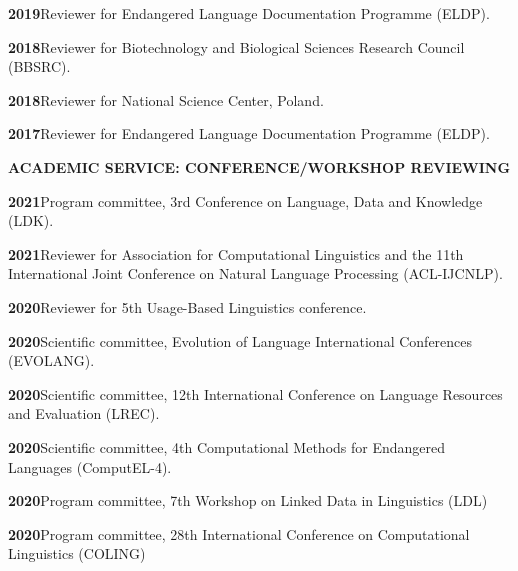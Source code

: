 \documentclass[11pt]{article}
\newcommand{\hangpara}{
 \setlength{\parindent}{0in} %
 \hangindent=0.42in %
}
\begin{document}
\vskip 6pt
\hangpara
{\bf 2019}\hspace{1ex}Reviewer for Endangered Language Documentation Programme (ELDP).

\vskip 6pt
\hangpara
{\bf 2018}\hspace{1ex}Reviewer for Biotechnology and Biological Sciences Research Council (BBSRC).

\vskip 6pt
\hangpara
{\bf 2018}\hspace{1ex}Reviewer for National Science Center, Poland.

\vskip 6pt
\hangpara
{\bf 2017}\hspace{1ex}Reviewer for Endangered Language Documentation Programme (ELDP).


\vskip 20pt
\begin{flushleft}
{\bf ACADEMIC SERVICE: CONFERENCE/WORKSHOP REVIEWING}
\end{flushleft}


\hangpara
{\bf 2021}\hspace{1ex}Program committee, 3rd Conference on Language, Data and Knowledge (LDK).

\hangpara
\vskip 6pt
{\bf 2021}\hspace{1ex}Reviewer for Association for Computational Linguistics and the 11th International Joint Conference on Natural Language Processing (ACL-IJCNLP).

\vskip 6pt
\hangpara
{\bf 2020}\hspace{1ex}Reviewer for 5th Usage-Based Linguistics conference.

\vskip 6pt
\hangpara
{\bf 2020}\hspace{1ex}Scientific committee, Evolution of Language International Conferences (EVOLANG).

\vskip 6pt
\hangpara
{\bf 2020}\hspace{1ex}Scientific committee, 12th International Conference on Language Resources and Evaluation (LREC).

\vskip 6pt
\hangpara
{\bf 2020}\hspace{1ex}Scientific committee, 4th Computational Methods for Endangered Languages (ComputEL-4).

\vskip 6pt
\hangpara
{\bf 2020}\hspace{1ex}Program committee, 7th Workshop on Linked Data in Linguistics (LDL)

\vskip 6pt
\hangpara
{\bf 2020}\hspace{1ex}Program committee, 28th International Conference on Computational Linguistics (COLING)
\end{document}
